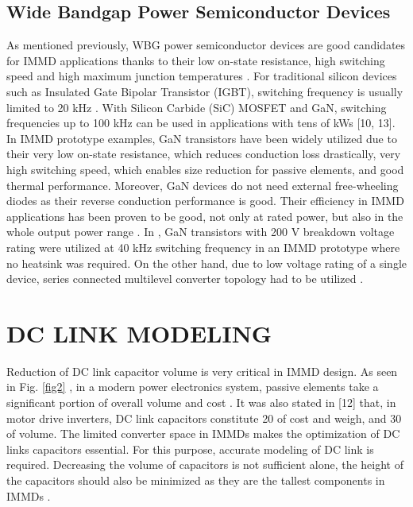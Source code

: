 \documentclass[conference,a4paper,twocolumn]{IEEEtran}
\begin{document}
\subsection{Wide Bandgap Power Semiconductor Devices}


As mentioned previously, WBG power semiconductor devices are good candidates for IMMD applications thanks to their low on-state resistance, high switching speed and high maximum junction temperatures \cite{Morita2011}. For traditional silicon devices such as Insulated Gate Bipolar Transistor (IGBT), switching frequency is usually limited to 20 kHz \cite{Lambert2015a}. With Silicon Carbide (SiC) MOSFET and GaN, switching frequencies up to 100 kHz can be used in applications with tens of kWs [10, 13]\cite{Wang2015,Morita2011}.
In IMMD prototype examples, GaN transistors have been widely utilized due to their very low on-state resistance, which reduces conduction loss drastically, very high switching speed, which enables size reduction for passive elements, and good thermal performance. Moreover, GaN devices do not need external free-wheeling diodes as their reverse conduction performance is good. Their efficiency in IMMD applications has been proven to be good, not only at rated power, but also in the whole output power range \cite{Morita2011}. In \cite{Wang2015}, GaN transistors with 200 V breakdown voltage rating were utilized at 40 kHz switching frequency in an IMMD prototype where no heatsink was required. On the other hand, due to low voltage rating of a single device, series connected multilevel converter topology had to be utilized \cite{Wang2013}.




\section{DC LINK MODELING}


Reduction of DC link capacitor volume is very critical in IMMD design. As seen in Fig. \ref{fig2} , in a modern power electronics system, passive elements take a significant portion of overall volume and cost \cite{LoCalzo2016}. It was also stated in [12] that, in motor drive inverters, DC link capacitors constitute 20 of cost and weigh, and 30 of volume. The limited converter space in IMMDs makes the optimization of DC links capacitors essential. For this purpose, accurate modeling of DC link is required. Decreasing the volume of capacitors is not sufficient alone, the height of the capacitors should also be minimized as they are the tallest components in IMMDs \cite{Wang2013,Wang2015}.
\end{document}
